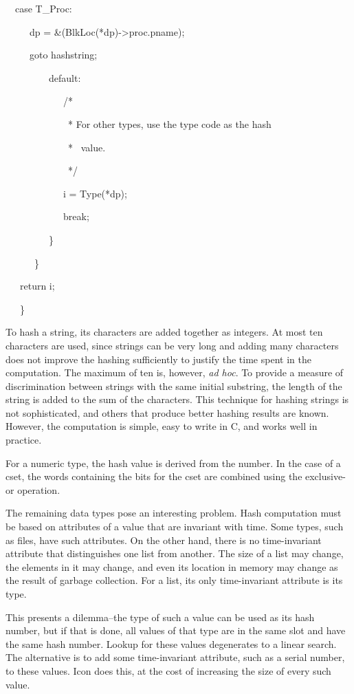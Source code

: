 \ \  case T\_Proc:

\ \  \ \ \ dp = \&(BlkLoc(*dp)-{\textgreater}proc.pname);

\ \  \ \ \ goto hashstring;

\ \ \ \ \ \ \ \ \ default:

\ \ \ \ \ \ \ \ \ \ \ \ /*

\ \ \ \ \ \ \ \ \ \ \ \ \ * For other types, use the type code as the hash

\ \ \ \ \ \ \ \ \ \ \ \ \ * \ value.

\ \ \ \ \ \ \ \ \ \ \ \ \ */

\ \ \ \ \ \ \ \ \ \ \ \ i = Type(*dp);

\ \ \ \ \ \ \ \ \ \ \ \ break;

\ \ \ \ \ \ \ \ \ \}

\ \ \ \ \ \ \}

\ \ \ return i;

\ \ \ \}


To hash a string, its characters are added together as integers. At
most ten characters are used, since strings can be very long and
adding many characters does not improve the hashing sufficiently to
justify the time spent in the computation. The maximum of ten is,
however, \textit{ad hoc}. To provide a measure of discrimination
between strings with the same initial substring, the length of the
string is added to the sum of the characters. This technique for
hashing strings is not sophisticated, and others that produce better
hashing results are known. However, the computation is simple, easy to
write in C, and works well in practice.

For a numeric type, the hash value is derived from the number. In the
case of a cset, the words containing the bits for the cset are
combined using the exclusive-or operation.

The remaining data types pose an interesting problem. Hash computation
must be based on attributes of a value that are invariant with
time. Some types, such as files, have such attributes. On the other
hand, there is no time-invariant attribute that distinguishes one list
from another. The size of a list may change, the elements in it may
change, and even its location in memory may change as the result of
garbage collection. For a list, its only time-invariant attribute is
its type.

This presents a dilemma--the type of such a value can be used as its
hash number, but if that is done, all values of that type are in the
same slot and have the same hash number. Lookup for these values
degenerates to a linear search.  The alternative is to add some
time-invariant attribute, such as a serial number, to these
values. Icon does this, at the cost of increasing the size of every
such value.

